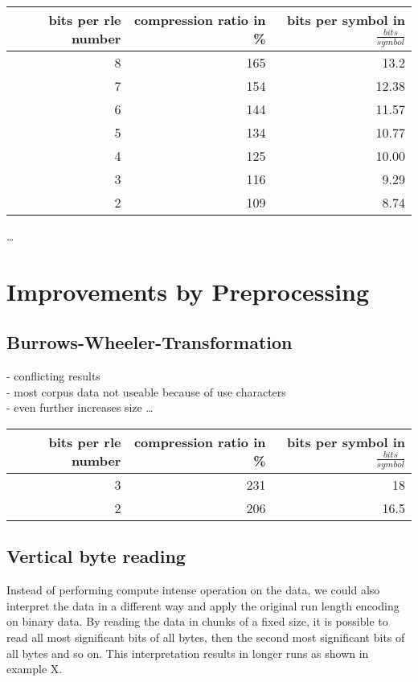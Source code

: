 \begin{center}
	\begin{tabular}[p]{r|r|r}
				\label{tab:t5 run length eval}
		
		bits per rle number & compression ratio in \% & bits per symbol in $\frac{bits}{symbol}$\\
		\hline
		8 & 165 & 13.2 \\
		7 & 154 & 12.38\\
		6 & 144 & 11.57 \\
		5 & 134 & 10.77\\
		4 & 125 & 10.00\\
		3 & 116 & 9.29\\
		2 & 109 & 8.74 \\
	\end{tabular}
\end{center}

\ldots

\section{Improvements by Preprocessing}
\label{ch:Analysis:sec:Improvements by Preprocessing}
\subsection{Burrows-Wheeler-Transformation}
- conflicting results \\
- most corpus data not useable because of use characters \\
- even further increases size
\ldots

\begin{center}
	\begin{tabular}[p]{r|r|r}
		\label{tab:t5 run length eval}
		
		bits per rle number & compression ratio in \% & bits per symbol in $\frac{bits}{symbol}$\\
		\hline
		3 & 231 & 18\\
		2 & 206 & 16.5\\
	\end{tabular}
\end{center}


\subsection{Vertical byte reading}
\par{
Instead of performing compute intense operation on the data, we could also interpret the data in a different way and apply the original run length encoding on binary data. By reading the data in chunks of a fixed size, it is possible to read all most significant bits of all bytes, then the second most significant bits of all bytes and so on. This interpretation results in longer runs as shown in example X.
}

